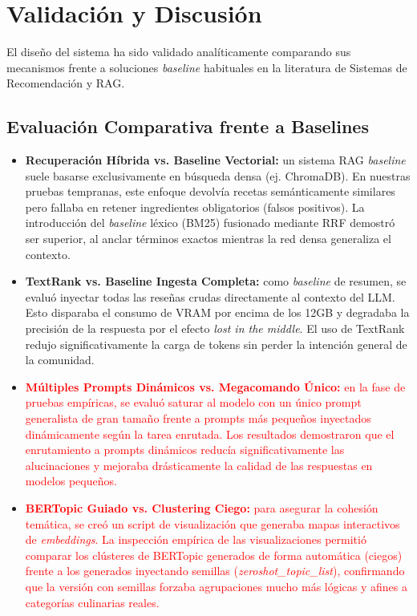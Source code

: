 \documentclass[11pt,a4paper]{article}
\begin{document}
\section{Validación y Discusión}

El diseño del sistema ha sido validado analíticamente comparando sus mecanismos frente a soluciones \textit{baseline} habituales en la literatura de Sistemas de Recomendación y RAG.

\subsection{Evaluación Comparativa frente a Baselines}

\begin{itemize}
    \item \textbf{Recuperación Híbrida vs. Baseline Vectorial:} un sistema RAG \textit{baseline} suele basarse exclusivamente en búsqueda densa (ej. ChromaDB). En nuestras pruebas tempranas, este enfoque devolvía recetas semánticamente similares pero fallaba en retener ingredientes obligatorios (falsos positivos). La introducción del \textit{baseline} léxico (BM25) fusionado mediante RRF demostró ser superior, al anclar términos exactos mientras la red densa generaliza el contexto.
    \item \textbf{TextRank vs. Baseline Ingesta Completa:} como \textit{baseline} de resumen, se evaluó inyectar todas las reseñas crudas directamente al contexto del LLM. Esto disparaba el consumo de VRAM por encima de los 12GB y degradaba la precisión de la respuesta por el efecto \textit{lost in the middle}. El uso de TextRank redujo significativamente la carga de tokens sin perder la intención general de la comunidad.
    \item \textcolor{red}{\textbf{Múltiples Prompts Dinámicos vs. Megacomando Único:} en la fase de pruebas empíricas, se evaluó saturar al modelo con un único prompt generalista de gran tamaño frente a prompts más pequeños inyectados dinámicamente según la tarea enrutada. Los resultados demostraron que el enrutamiento a prompts dinámicos reducía significativamente las alucinaciones y mejoraba drásticamente la calidad de las respuestas en modelos pequeños.}
    \item \textcolor{red}{\textbf{BERTopic Guiado vs. Clustering Ciego:} para asegurar la cohesión temática, se creó un script de visualización que generaba mapas interactivos de \textit{embeddings}. La inspección empírica de las visualizaciones permitió comparar los clústeres de BERTopic generados de forma automática (ciegos) frente a los generados inyectando semillas (\textit{zeroshot\_topic\_list}), confirmando que la versión con semillas forzaba agrupaciones mucho más lógicas y afines a categorías culinarias reales.}
\end{itemize}
\end{document}
